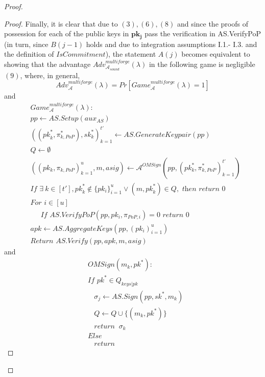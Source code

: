 \begin{proof}
\begin{proof}
\noindent Finally, it is clear that due to $(3), (6), (8)$ and since the proofs of possession for each of the public 
keys in $\mathbf{pk_j}$ pass the verification in AS.VerifyPoP (in turn, since $B(j-1)$ holds and due to integration assumptions 
I.1.- I.3. and the definition of $\mathit{IsCommitment}$), the statement $A(j)$ 
becomes equivalent to showing that the advantage
$\mathit{Adv}^{\mathit{multiforge}}_{\mathcal{A}_{\mathit{sound}}}({\lambda})$ in the following game is negligible $(9)$,
where, in general, 
$$\mathit{Adv}^{\mathit{multiforge}}_{\mathcal{A}}({\lambda}) = \mathit{Pr}[\mathit{Game}^{\mathit{multiforge}}_{\mathcal{A}}({\lambda}) =1]$$
\noindent and 
\begin{align*}
&\mathit{Game}^{\mathit{multiforge}}_{\mathcal{A}}({\lambda}): \\
& \mathit{pp} \leftarrow \mathit{AS.Setup}(\mathit{aux_{\mathit{AS}}}) \\
& ((\mathit{pk}_{k}^*,\pi^*_{k, \mathit{PoP}}), \mathit{sk}_{k}^*)_{k=1}^{t'} \leftarrow \mathit{AS.GenerateKeypair}(\mathit{pp})\\
& Q \leftarrow \emptyset \ \\
& ((\mathit{pk_k}, \pi_{k,\mathit{PoP}})_{k=1}^{u}, m, \mathit{asig}) \leftarrow \mathcal{A}^{\mathit{OMSign}}(\mathit{pp}, (\mathit{pk_k^*},\pi^*_{k,\mathit{PoP}})_{k=1}^{t'}) \\
& \textit{If } \exists \ k \in [t'], \mathit{pk}_{k}^*  \notin \{ \mathit{pk_i} \}_{i=1}^{u}  \vee (m, \mathit{pk}^*_{k}) \in Q, \textit{ then return } 0 \\
& \textit{For } i \in [u] \\
& \ \ \ \ \ \textit{ If } \mathit{AS.VerifyPoP}(\mathit{pp}, \mathit{pk_i}, \pi_{\mathit{PoP},i})=0  \textit{ return } 0 \\
& \mathit{apk} \leftarrow \mathit{AS.AggregateKeys}(\mathit{pp}, (\mathit{pk_i})_{i=1}^{u}) \\
& \textit{Return } \mathit{AS.Verify}(\mathit{pp}, \mathit{apk}, m, \mathit{asig})
\end{align*}
\noindent and
\begin{align*}
& \mathit{OMSign}(m_k, \mathit{pk}^*): \\
& \textit{If } \mathit{pk}^* \in Q_{\mathit{keys}|\mathit{pk}} \\
& \ \ \ \ \sigma_j \leftarrow \mathit{AS.Sign}(\mathit{pp}, \mathit{sk}^*, m_k) \\
& \ \ \ \  Q \leftarrow Q \cup \{(m_k,  \mathit{pk}^*) \} \\
& \ \ \ \ \textit{return } \ \sigma_k \\
& Else \\
& \ \ \ \ \textit{return}
\end{align*}


\end{proof}
\end{proof}
